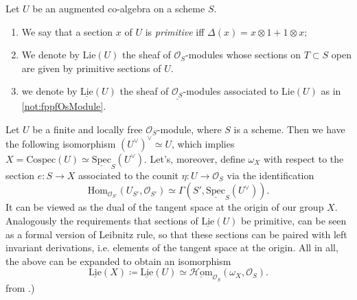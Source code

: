 \documentclass[../Main]{subfiles}
\begin{document}
\begin{defn}[]
	Let $U$ be an augmented co-algebra on a scheme $S$.
\begin{enumerate}
\item We say that a section $x$ of $U$ is {\em primitive} iff
	$\Delta(x) = x \otimes 1 + 1 \otimes x$;

\item We denote by $\mathrm{Lie}(U)$ the sheaf of $\mathcal{O}_{ S }$-modules
	whose sections on $T \subset S$ open are given by
	primitive sections of $U$.

\item we denote by $\underline{\mathrm{Lie}}(U)$ the sheaf of $\underline{\mathcal{O}_{ S }}$-modules
	associated to $\mathrm{Lie}(U)$ as in \cref{not:fppfOsModule}.
\end{enumerate}
\end{defn}


\begin{rem}
	Let $U$ be a finite and locally free $\mathcal{O}_{ S }$-module,
	where $S$ is a scheme.
	Then we have the following isomorphism $(U^\vee)^\vee \simeq U$,
	which implies $X = \mathrm{Cospec}(U) \simeq 
	\underline{\mathrm{Spec}}_S(U^\vee)$.
	Let's, moreover, define $\omega_X$ with respect to the section $e\colon S \to X$
	associated to the counit $\eta\colon U \to \mathcal{O}_{ S }$
	via the identification
	\begin{equation*}
		\mathrm{Hom}_{ \mathcal{O}_{ S' }}
		\left( U_{S'}, \mathcal{O}_{ S' } \right) 
		\simeq
		\Gamma(S', \underline{\mathrm{Spec}}_S(U^\vee))
	.\end{equation*}
	It can be viewed as the dual of the tangent space at the origin
	of our group $X$.
	Analogously the requirements that sections of $\underline{\mathrm{Lie}}(U)$
	be primitive, can be seen as a formal version of Leibnitz rule,
	so that these sections can be paired with left invariant derivations, i.e.
	elements of the tangent space at the origin.
	All in all, the above can be expanded to obtain an isomorphism
	\begin{equation*}
		\underline{\mathrm{Lie}}(X) \coloneqq
		\underline{\mathrm{Lie}}(U) \simeq
		\underline{\mathcal{H}\mathrm{om}}_{ \mathcal{O}_{ S } } 
		\left(\omega_X , \mathcal{O}_{ S } \right)
	.\end{equation*}
	from \cite{MilneAG}.)
\end{rem}
\end{document}
